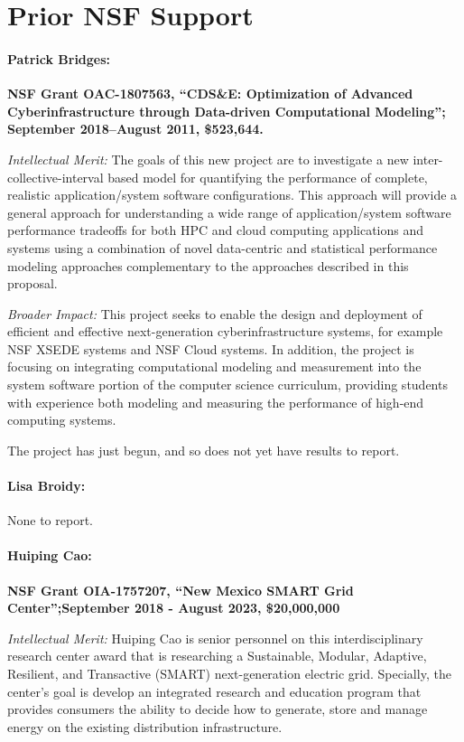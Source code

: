 \section{Prior NSF Support}
\label{sec:prior}

\paragraph{Patrick Bridges:}
\textbf{NSF Grant OAC-1807563, ``CDS\&E: Optimization of Advanced Cyberinfrastructure through Data-driven Computational Modeling''; September 2018--August 2011, \$523,644.}

\noindent\textit{Intellectual Merit:} The goals of this new project are to investigate a new inter-collective-interval based model for quantifying the performance of complete, realistic application/system software configurations. This approach will provide a general approach for understanding a wide range of application/system software performance tradeoffs for both HPC and cloud computing applications and systems using a combination of novel data-centric and statistical performance modeling approaches complementary to the approaches described in this proposal.

\noindent\textit{Broader Impact:} This project seeks to enable the design and deployment of efficient and effective next-generation cyberinfrastructure systems, for example NSF XSEDE systems and NSF Cloud systems. In addition, the project is focusing on integrating computational modeling and measurement into the system software portion of the computer science curriculum, providing students with experience both modeling and measuring the performance of high-end computing systems. 

\noindent The project has just begun, and so does not yet have results to report.

\paragraph{Lisa Broidy:} None to report.

\paragraph{Huiping Cao:} 
\textbf{NSF Grant OIA-1757207, ``New Mexico SMART Grid Center'';September 2018 - August 2023, \$20,000,000 }

\noindent\textit{Intellectual Merit:} Huiping Cao is senior personnel on this  interdisciplinary research center award that is researching a Sustainable, Modular, Adaptive, Resilient, and Transactive (SMART) next-generation electric grid. Specially, the center's goal is  develop an integrated research and education program that provides consumers the ability to decide how to generate, store and manage energy on the existing distribution infrastructure.

